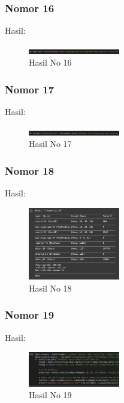 \begin{enumerate}
\subsubsection{Nomor 16}
\hfill\break

Hasil:
\begin{figure}[H]
\centering
	\includegraphics[width=4cm]{figures/1174075/7/no16.jpg}
	\caption{Hasil No 16}
\end{figure}

\subsubsection{Nomor 17}
\hfill\break

Hasil:
\begin{figure}[H]
\centering
	\includegraphics[width=4cm]{figures/1174075/7/no17.jpg}
	\caption{Hasil No 17}
\end{figure}

\subsubsection{Nomor 18}
\hfill\break

Hasil:
\begin{figure}[H]
\centering
	\includegraphics[width=4cm]{figures/1174075/7/no18.jpg}
	\caption{Hasil No 18}
\end{figure}

\subsubsection{Nomor 19}
\hfill\break

Hasil:
\begin{figure}[H]
\centering
	\includegraphics[width=4cm]{figures/1174075/7/no19.jpg}
	\caption{Hasil No 19}
\end{figure}


\end{enumerate}

